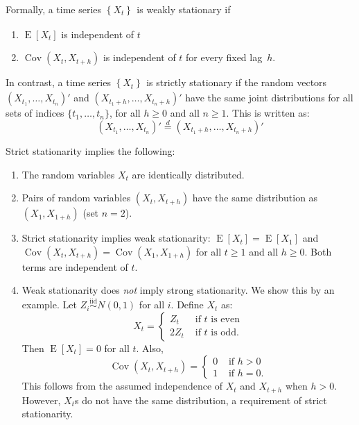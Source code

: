 \documentclass[11pt,a4]{article}
\DeclareMathOperator{\cov}{Cov}
\DeclareMathOperator{\E}{E}
\newcommand{\ts}[3]{\ensuremath{\left \{ #1 \right \}_{#2}^{#3}}}
\newcommand{\eqd}{\ensuremath{\stackrel{d}{=}}}
\newcommand{\iid}{\ensuremath{\stackrel{\text{iid}}{\sim}}}
\theoremstyle{definition}
\begin{document}
Formally, a time series $\ts{X_t}{}{}$ is weakly stationary if 
\begin{enumerate}
	\item $\E[X_t]$ is independent of $t$
	\item $\cov(X_t, X_{t + h})$ is independent of $t$ for every fixed lag~$h$.
\end{enumerate} 
In contrast, a time series $\ts{X_t}{}{}$ is strictly stationary if the random
vectors $(X_{t_1}, \ldots, X_{t_n})'$ and $(X_{t_1 + h}, \ldots, X_{t_n + h})'$
have the same joint distributions for all sets of indices $\{t_1, \ldots,
t_n\}$, for all $h \geq 0$ and all $n \geq 1$. This is written as:
\[
(X_{t_1}, \ldots, X_{t_n})' \eqd (X_{t_1 + h}, \ldots, X_{t_n + h})'
\] 

Strict stationarity implies the following:
\begin{enumerate}
\item The random variables $X_t$ are identically distributed.
	
	\item Pairs of random variables $(X_t, X_{t + h})$ have the same
distribution as $(X_1, X_{1 + h})$ (set $n = 2$).
	
	\item Strict stationarity implies weak stationarity: $\E[X_t] =
\E[X_1]$ and $\cov(X_t, X_{t + h}) = \cov(X_1, X_{1 + h})$ for all $t \geq 1$
and all $h \geq 0$. Both terms are independent of $t$.
	
	\item Weak stationarity does \emph{not} imply strong stationarity. We
show this by an example. Let $Z_i \iid N(0, 1)$ for all $i$. Define $X_t$ as:
\[ X_t = \left \{ \begin{array}{ll} Z_t   & \text{ if $t$ is even}\\ 
                                    2 Z_t & \text{ if $t$ is odd}.   
                  \end{array}	
         \right . 
\] 
Then $\E[X_t] = 0$ for all $t$. Also, 
\[
    \cov(X_t, X_{t + h}) = \left \{ 
                                \begin{array}{ll}
                                    0 & \text{ if } h > 0 \\
                                    1 & \text{ if } h = 0.
                                \end{array}
                           \right . 
\]
This follows from the assumed independence of $X_t$ and $X_{t + h}$ when $h > 0$. 
However, $X_t$s do not have the same distribution, a requirement of 
strict stationarity.
\end{enumerate}
\end{document}
